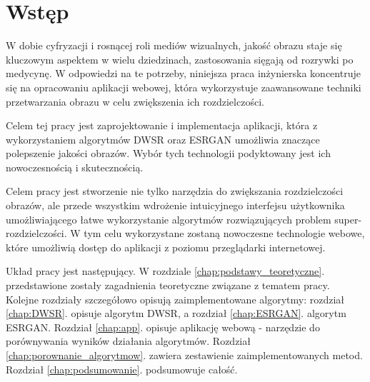 \chapter{Wstęp}

W dobie cyfryzacji i rosnącej roli mediów wizualnych, jakość obrazu staje się kluczowym aspektem w wielu dziedzinach, zastosowania sięgają od rozrywki po medycynę. W odpowiedzi na te potrzeby, niniejsza praca inżynierska koncentruje się na opracowaniu aplikacji webowej, która wykorzystuje zaawansowane techniki przetwarzania obrazu w celu zwiększenia ich rozdzielczości.

Celem tej pracy jest zaprojektowanie i implementacja aplikacji, która z wykorzystaniem algorytmów DWSR \cite{guo2017deep} oraz ESRGAN \cite{wang2018esrgan} umożliwia znaczące polepszenie jakości obrazów. Wybór tych technologii podyktowany jest ich nowoczesnością i skutecznością.


Celem pracy jest stworzenie nie tylko narzędzia do zwiększania rozdzielczości obrazów, ale przede wszystkim wdrożenie intuicyjnego interfejsu użytkownika umożliwiającego łatwe wykorzystanie algorytmów rozwiązujących problem super-rozdzielczości. W tym celu wykorzystane zostaną nowoczesne technologie webowe, które umożliwią dostęp do aplikacji z poziomu przeglądarki internetowej.

Układ pracy jest następujący. W rozdziale \ref{chap:podstawy_teoretyczne}. przedstawione zostały zagadnienia teoretyczne związane z tematem pracy. Kolejne rozdziały szczegółowo opisują zaimplementowane algorytmy: rozdział \ref{chap:DWSR}. opisuje algorytm DWSR, a rozdział \ref{chap:ESRGAN}. algorytm ESRGAN. Rozdział \ref{chap:app}. opisuje aplikację webową - narzędzie do porównywania wyników działania algorytmów. Rozdział \ref{chap:porownanie_algorytmow}. zawiera zestawienie zaimplementowanych metod. Rozdział \ref{chap:podsumowanie}. podsumowuje całość.